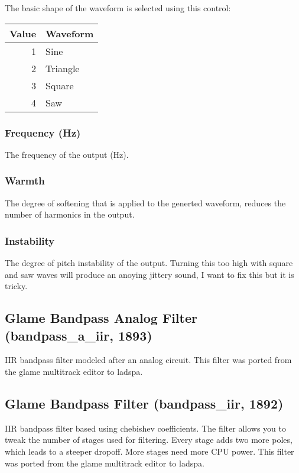 \documentclass[11pt]{article}
\begin{document}
	The basic shape of the waveform is selected using this control:

	\begin{tabular}{|r|l|}
	\hline
	Value & Waveform \\
	\hline \hline
	1 & Sine \\
	2 & Triangle \\
	3 & Square \\
	4 & Saw \\
        \hline
	\end{tabular}
      \subsubsection*{Frequency (Hz)}
The frequency of the output (Hz).\subsubsection*{Warmth}
The degree of softening that is applied to the generted waveform, reduces the number of harmonics in the output.\subsubsection*{Instability}
The degree of pitch instability of the output. Turning this too high with square and saw waves will produce an anoying jittery sound, I want to fix this but it is tricky.\subsection{Glame Bandpass Analog Filter (bandpass\_a\_iir, 1893)\label{bandpass_a_iir}\label{id1893}}
 IIR bandpass filter modeled after an analog circuit. This filter was ported from the glame multitrack editor to ladspa.
                \subsection{Glame Bandpass Filter (bandpass\_iir, 1892)\label{bandpass_iir}\label{id1892}}
 IIR bandpass filter based using chebishev coefficients. The filter allows you to tweak the number of stages used for
                filtering. Every stage adds two more poles, which leads to a steeper dropoff. More stages need more CPU power. This
                filter was ported from the glame multitrack editor to ladspa.
\end{document}
